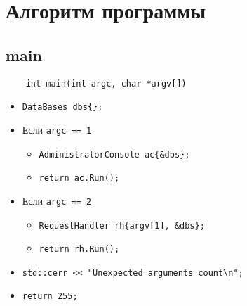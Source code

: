\section{Алгоритм программы}

\subsection{main}

\begin{lstlisting}
    int main(int argc, char *argv[])
\end{lstlisting}

\begin{itemize}
    \item \verb|DataBases dbs{};|
    \item Если \verb|argc == 1|
    \begin{itemize}
        \item \verb|AdministratorConsole ac{&dbs};|
        \item \verb|return ac.Run();|
    \end{itemize}
    \item Если \verb|argc == 2|
    \begin{itemize}
        \item \verb|RequestHandler rh{argv[1], &dbs};|
        \item \verb|return rh.Run();|
    \end{itemize}
    \item \verb|std::cerr << "Unexpected arguments count\n";|
    \item \verb|return 255;|
\end{itemize}




















